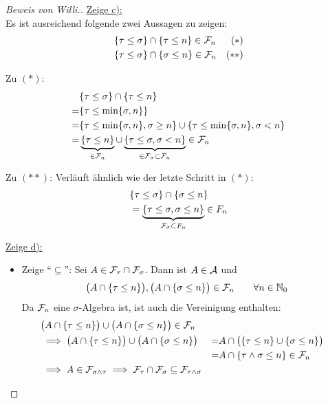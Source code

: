 \documentclass[12pt,a4paper]{article}
\begin{document}
\begin{proof}[Beweis von Willi.]
\underline{Zeige c):}\\
Es ist ausreichend folgende zwei Aussagen zu zeigen:
\begin{align*}
	\lbrace \tau \leq \sigma\rbrace &\cap \lbrace \tau \leq n\rbrace \in \mathcal{F}_n &(\ast)&\\
	\lbrace \tau \leq \sigma\rbrace &\cap \lbrace \sigma \leq n\rbrace \in \mathcal{F}_n &(\ast\ast)& \\
\end{align*}

Zu $(\ast)$:
\begin{align*}
	&\lbrace \tau \leq \sigma\rbrace \cap \lbrace \tau \leq n\rbrace\\
	=&\lbrace \tau \leq \min\{\sigma, n\}\rbrace  \\
	=&\lbrace \tau \leq \min\{\sigma, n\}, \sigma \geq n\rbrace \cup 
	\lbrace \tau \leq \min\{\sigma, n\}, \sigma < n\rbrace \\
	=&\underbrace{\lbrace \tau \leq n\rbrace}_{\in \mathcal{F}_n} \cup
	\underbrace{\lbrace \tau \leq \sigma, \sigma < n\rbrace}_{\in \mathcal{F}_\sigma \subset \mathcal{F}_n} \in \mathcal{F}_n \\
\end{align*}

Zu $(\ast\ast)$:
Verläuft ähnlich wie der letzte Schritt in $(\ast)$:
\begin{align*}
	&\lbrace \tau \leq \sigma\rbrace \cap \lbrace \sigma \leq n\rbrace \\
	&=\underbrace{\lbrace \tau \leq \sigma, \sigma \leq n\rbrace}_{\mathcal{F}_\sigma \subset F_n} \in F_n \\
\end{align*}



\underline{Zeige d):}\\
\begin{itemize}
\item Zeige ``$\subseteq$'':
Sei $A\in\mathcal{F}_\tau\cap\mathcal{F}_\sigma$. Dann ist $A\in\mathcal{A}$ und
\begin{align*}
\big(A\cap\lbrace\tau\leq n\rbrace\big),\big(A\cap\lbrace\sigma\leq n\rbrace\big)\in\mathcal{F}_n\qquad\forall n\in\mathbb{N}_0
\end{align*}
Da $\mathcal{F}_n$ eine $\sigma$-Algebra ist, ist auch die Vereinigung enthalten:
\begin{align*}
&\big(A\cap\lbrace\tau\leq n\rbrace\big)\cup\big(A\cap\lbrace\sigma\leq n\rbrace\big)\in\mathcal{F}_n\\
&\implies
\big(A\cap\lbrace\tau\leq n\rbrace\big)\cup\big(A\cap\lbrace\sigma\leq n\rbrace\big)
&=&A\cap\big(\lbrace\tau\leq n\rbrace\cup\lbrace\sigma\leq n\rbrace\big)\\
&&=&A\cap\lbrace\tau\wedge\sigma\leq n\rbrace\in\mathcal{F}_n\\
&\implies A\in\mathcal{F}_{\sigma\wedge\tau}\implies \mathcal{F}_\tau\cap\mathcal{F}_\sigma\subseteq\mathcal{F}_{\tau\wedge\sigma}
\end{align*}


\end{itemize}
\end{proof}
\end{document}
